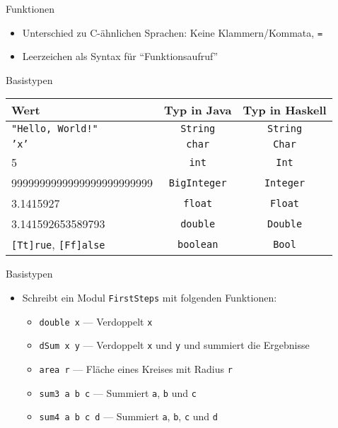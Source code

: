 \documentclass{beamer}
\begin{document}
\begin{frame}{Funktionen}

        \begin{itemize}
                \item Unterschied zu C-ähnlichen Sprachen: Keine Klammern/Kommata, \texttt{=}
                \item Leerzeichen als Syntax für \enquote{Funktionsaufruf}
        \end{itemize}
\end{frame}

\begin{frame}{Basistypen}
        \begin{tabular}{ l | c | c }
                Wert & Typ in Java & Typ in Haskell \\
                \hline
                \texttt{"Hello, World!"} & \texttt{String} & \pause \texttt{String} \\
                \texttt{'x'} & \texttt{char} & \pause \texttt{Char} \\
                5 & \texttt{int} & \pause \texttt{Int} \\
                9999999999999999999999999 & \texttt{BigInteger} & \pause \texttt{Integer} \\
                3.1415927 & \texttt{float} & \pause \texttt{Float} \\
                3.141592653589793 & \texttt{double} & \pause \texttt{Double} \\
                \texttt{[Tt]rue}, \texttt{[Ff]alse} & \texttt{boolean} & \pause \texttt{Bool} \\
        \end{tabular}
\end{frame}

\begin{frame}{Basistypen}

        \begin{itemize}
                \item Schreibt ein Modul \texttt{FirstSteps} mit folgenden Funktionen:
                \begin{itemize}
                        \item \texttt{double x} --- Verdoppelt \texttt{x}
                        \item \texttt{dSum x y} --- Verdoppelt \texttt{x} und \texttt{y} und summiert die Ergebnisse
                        \item \texttt{area r} --- Fläche eines Kreises mit Radius \texttt{r}
                        \item \texttt{sum3 a b c} --- Summiert \texttt{a}, \texttt{b} und \texttt{c}
                        \item \texttt{sum4 a b c d} --- Summiert \texttt{a}, \texttt{b}, \texttt{c} und \texttt{d}
                \end{itemize}
        \end{itemize}
\end{frame}
\end{document}
